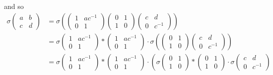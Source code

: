and so
\begin{align*}
\sigma\left(\begin{matrix} a & b \\ c & d \end{matrix}\right) &= 
\sigma\left(
\left(\begin{matrix} 1 & ac^{-1} \\ 0 & 1 \end{matrix}\right)
\left(\begin{matrix} 0 & 1 \\ 1 & 0 \end{matrix}\right)
\left(\begin{matrix} c & d \\ 0 & c^{-1} \end{matrix}\right)
\right) \\
&=
\sigma \left(\begin{matrix} 1 & ac^{-1} \\ 0 & 1 \end{matrix}\right) *
\left(\begin{matrix} 1 & ac^{-1} \\ 0 & 1 \end{matrix}\right) \cdot
\sigma \left( 
\left(\begin{matrix} 0 & 1 \\ 1 & 0 \end{matrix}\right)
\left(\begin{matrix} c & d \\ 0 & c^{-1} \end{matrix}\right)
\right) \\
&=
\sigma \left(\begin{matrix} 1 & ac^{-1} \\ 0 & 1 \end{matrix}\right) *
\left(\begin{matrix} 1 & ac^{-1} \\ 0 & 1 \end{matrix}\right) \cdot
\left( 
\sigma \left(\begin{matrix} 0 & 1 \\ 1 & 0 \end{matrix}\right) *
\left(\begin{matrix} 0 & 1 \\ 1 & 0 \end{matrix}\right) \cdot
\sigma\left(\begin{matrix} c & d \\ 0 & c^{-1} \end{matrix}\right)

\end{align*}
